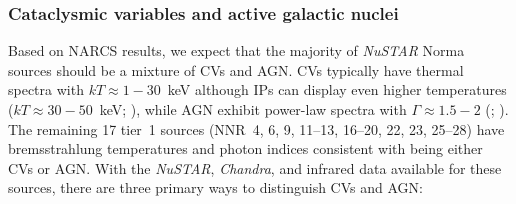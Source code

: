 \documentclass[iop,revtex4]{emulateapj}
\begin{document}
\subsubsection{Cataclysmic variables and active galactic nuclei}
\label{sec:cv}
Based on NARCS results, we expect that the majority of \textit{NuSTAR} Norma sources should be a mixture of CVs and AGN.  CVs typically have thermal spectra with $kT\approx1-30$~keV although IPs can display even higher temperatures ($kT\approx30-50$~keV; \citealt{landi09}), while AGN exhibit power-law spectra with $\Gamma\approx1.5-2$ (\citealt{tozzi06}; \citealt{sazonov08}).  The remaining 17 tier~1 sources (NNR~4, 6, 9, 11--13, 16--20, 22, 23, 25--28) have bremsstrahlung temperatures and photon indices consistent with being either CVs or AGN.  
With the \textit{NuSTAR}, \textit{Chandra}, and infrared data available for these sources, there are three primary ways to distinguish CVs and AGN: 
\end{document}
